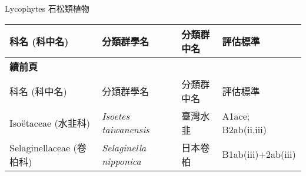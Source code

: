 \noindent\normalfont\selectfont Lycophytes 石松類植物
\footnotesize\selectfont
        \begin{longtable}{p{3cm}p{5cm}p{3cm}p{4cm}}
        \toprule
          科名 (科中名) & 分類群學名 & 分類群中名 & 評估標準 \\
        \midrule 
        \endfirsthead

        {{\bfseries 續前頁 }} \\
        科名 (科中名) & 分類群學名 & 分類群中名 & 評估標準 \\
        \midrule
        \endhead
                Isoëtaceae (水韭科) & \textit{Isoetes taiwanensis}  & 臺灣水韭 & A1ace; B2ab(ii,iii) \index{Isoetes@\textit{Isoetes}!taiwanensis@\textit{taiwanensis}}  \index{臺灣水韭} \\
    Selaginellaceae (卷柏科) & \textit{Selaginella nipponica}  & 日本卷柏 & B1ab(iii)+2ab(iii) \index{Selaginella@\textit{Selaginella}!nipponica@\textit{nipponica}}  \index{日本卷柏} \\
    \bottomrule
        \end{longtable}
